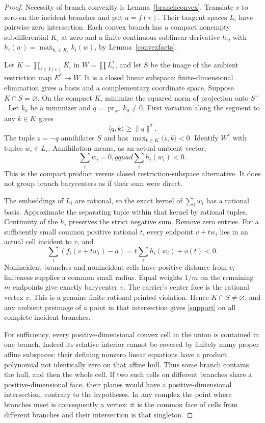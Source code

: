 \documentclass[11pt]{article}
\begin{document}
\begin{proof}
Necessity of branch convexity is Lemma~\ref{branchconvex}. Translate $v$ to zero on the incident branches and put $a=f(v)$. Their tangent spaces $L_i$ have pairwise zero intersection. Each convex branch has a compact nonempty subdifferential $K_i$ at zero and a finite continuous sublinear derivative $h_i$, with $h_i(w)=\max_{k_i\in K_i}k_i(w)$, by Lemma~\ref{convexfacts}.

Let $K=\prod_{i\in I(v)}K_i$ in $W=\prod L_i^*$, and let $S$ be the image of the ambient restriction map $E^*\to W$. It is a closed linear subspace: finite-dimensional elimination gives a basis and a complementary coordinate space. Suppose $K\cap S=\varnothing$. On the compact $K$, minimize the squared norm of projection onto $S^\perp$. Let $k_0$ be a minimizer and $q=\operatorname{pr}_{S^\perp}k_0\ne0$. First variation along the segment to any $k\in K$ gives
\[
 \langle q,k\rangle\geq\|q\|^2.
\]
The tuple $z=-q$ annihilates $S$ and has $\max_{k\in K}\langle z,k\rangle<0$. Identify $W^*$ with tuples $w_i\in L_i$. Annihilation means, as an actual ambient vector,
\[
 \sum_i w_i=0,qquad \sum_i h_i(w_i)<0.
\]
This is the compact product versus closed restriction-subspace alternative. It does not group branch barycenters as if their sum were direct.

The embeddings of $L_i$ are rational, so the exact kernel of $\sum_i w_i$ has a rational basis. Approximate the separating tuple within that kernel by rational tuples. Continuity of the $h_i$ preserves the strict negative sum. Remove zero entries. For a sufficiently small common positive rational $t$, every endpoint $v+tw_i$ lies in an actual cell incident to $v$, and
\[
 \sum_i(f_i(v+tw_i)-a)
       =t\sum_i h_i(w_i)+o(t)<0.
\]
Nonincident branches and nonincident cells have positive distance from $v$; finiteness supplies a common small radius. Equal weights $1/m$ on the remaining $m$ endpoints give exactly barycenter $v$. The carrier's center face is the rational vertex $v$. This is a genuine finite rational printed violation. Hence $K\cap S\ne\varnothing$, and any ambient preimage of a point in that intersection gives \eqref{support} on all complete incident branches.

For sufficiency, every positive-dimensional convex cell in the union is contained in one branch. Indeed its relative interior cannot be covered by finitely many proper affine subspaces: their defining nonzero linear equations have a product polynomial not identically zero on that affine hull. Thus some branch contains the hull, and then the whole cell. If two such cells on different branches share a positive-dimensional face, their planes would have a positive-dimensional intersection, contrary to the hypotheses. In any complex the point where branches meet is consequently a vertex: it is the common face of cells from different branches and their intersection is that singleton.


\end{proof}
\end{document}
